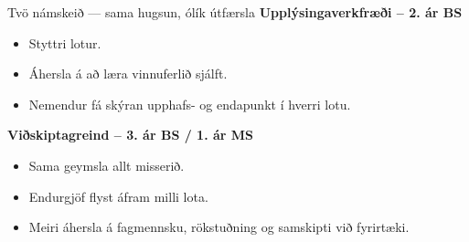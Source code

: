 \documentclass[
    NAME={Dr. Helga Ingimundardóttir},
    EMAIL={helgaingim@hi.is},
    FACULTY={Iðnaðarverkfræði},
    TITLE={Sýnileg samvinna með tólum atvinnulífsins},
    SUBTITLE={PR vinnulag og gagnsæir ferlar í verkefnadrifinni verkfræðikennslu},
    SEMINAR={Kennsluráðstefna KHA},
    DATE={28. mars 2026},
    WIDE=true,
    ICELANDIC=true
]{HI-LaTeX//hi-beamer}
\begin{document}
\begin{frame}{Tvö námskeið --- sama hugsun, ólík útfærsla}
\textbf{Upplýsingaverkfræði -- 2. ár BS}
\begin{itemize}
  \item Styttri lotur.
  \item Áhersla á að læra vinnuferlið sjálft.
  \item Nemendur fá skýran upphafs- og endapunkt í hverri lotu.
\end{itemize}

\vspace{0.75em}
\textbf{Viðskiptagreind -- 3. ár BS / 1. ár MS}
\begin{itemize}
  \item Sama geymsla allt misserið.
  \item Endurgjöf flyst áfram milli lota.
  \item Meiri áhersla á fagmennsku, rökstuðning og samskipti við fyrirtæki.
\end{itemize}




\end{frame}
\end{document}
